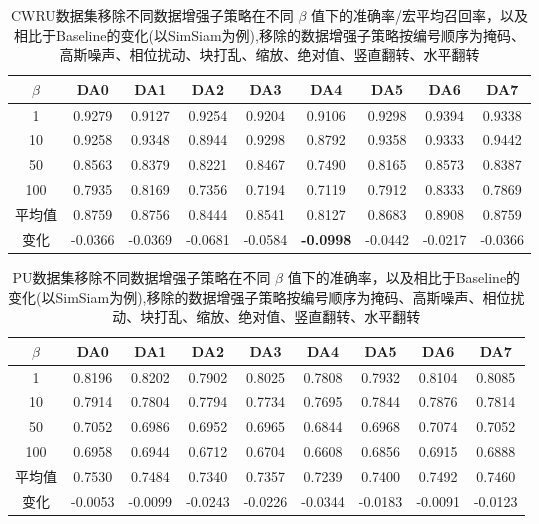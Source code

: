\documentclass[master]{thesis-uestc}
\begin{document}
\begin{table}[H]
    \caption{CWRU数据集移除不同数据增强子策略在不同 $\beta$ 值下的准确率/宏平均召回率，以及相比于Baseline的变化(以SimSiam为例),移除的数据增强子策略按编号顺序为掩码、高斯噪声、相位扰动、块打乱、缩放、绝对值、竖直翻转、水平翻转}
    \centering
    \begin{tabular}{ccccccccc}
    \toprule
    $\beta$  & DA0 & DA1 & DA2 & DA3 & DA4 & DA5 & DA6 & DA7 \\
    \midrule
    1   & 0.9279  & 0.9127 & 0.9254 & 0.9204 & 0.9106 & 0.9298 & 0.9394 & 0.9338  \\
    10  & 0.9258  & 0.9348 & 0.8944 & 0.9298 & 0.8792 & 0.9358 & 0.9333 & 0.9442  \\
    50  & 0.8563  & 0.8379 & 0.8221 & 0.8467 & 0.7490 & 0.8165 & 0.8573 & 0.8387  \\
    100 & 0.7935  & 0.8169 & 0.7356 & 0.7194 & 0.7119 & 0.7912 & 0.8333 & 0.7869  \\
    \midrule
    平均值 & 0.8759 & 0.8756 & 0.8444 & 0.8541 & 0.8127 & 0.8683 & 0.8908 & 0.8759 \\
    \midrule
    变化 & -0.0366 & -0.0369 & -0.0681 & -0.0584 & \textbf{-0.0998} & -0.0442 & -0.0217 & -0.0366 \\
    \bottomrule
    \end{tabular}
    \label{tb:da_discuss_results}
\end{table}

\begin{table}[H]
\caption{PU数据集移除不同数据增强子策略在不同 $\beta$ 值下的准确率，以及相比于Baseline的变化(以SimSiam为例),移除的数据增强子策略按编号顺序为掩码、高斯噪声、相位扰动、块打乱、缩放、绝对值、竖直翻转、水平翻转}
\centering
\begin{tabular}{ccccccccc}
\toprule
$\beta$ & DA0 & DA1 & DA2 & DA3 & DA4 & DA5 & DA6 & DA7 \\
\midrule
1 & 0.8196 & 0.8202 & 0.7902 & 0.8025 & 0.7808 & 0.7932 & 0.8104 & 0.8085 \\
10 & 0.7914 & 0.7804 & 0.7794 & 0.7734 & 0.7695 & 0.7844 & 0.7876 & 0.7814 \\
50 & 0.7052 & 0.6986 & 0.6952 & 0.6965 & 0.6844 & 0.6968 & 0.7074 & 0.7052 \\
100 & 0.6958 & 0.6944 & 0.6712 & 0.6704 & 0.6608 & 0.6856 & 0.6915 & 0.6888 \\
\midrule
平均值 & 0.7530 & 0.7484 & 0.7340 & 0.7357 & 0.7239 & 0.7400 & 0.7492 & 0.7460 \\
\midrule
变化 & -0.0053 & -0.0099 & -0.0243 & -0.0226 & -0.0344 & -0.0183 & -0.0091 & -0.0123 \\
\bottomrule
\end{tabular}
\label{tb:da_discuss_results_pu}
\end{table}
\end{document}
